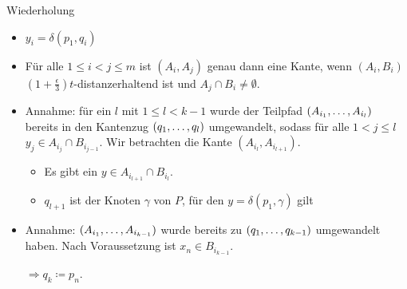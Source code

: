 \documentclass{beamer}
\begin{document}
	\begin{frame}[t]
		\begin{block}{Wiederholung}
			\begin{itemize}
				\item $y_i = \delta(p_1, q_i)$
				\item Für alle $1\leq i < j \leq m$ ist $(A_i, A_j)$ genau dann eine Kante, wenn $(A_i, B_i)$ $(1 + \frac{\epsilon}{3})t$-distanzerhaltend ist und $A_j \cap B_i \neq \emptyset$.
			\end{itemize}
		\end{block}
		
		
		\vspace{10px}
		\begin{itemize}
			\item<2-> Annahme: für ein $l$ mit $1 \leq l < k-1$ wurde der Teilpfad $(A_{i_1}, \mathellipsis, A_{i_l})$ bereits in den Kantenzug $(q_1, \mathellipsis, q_l)$ umgewandelt, sodass für alle $1 < j \leq l$ $y_j \in A_{i_j} \cap B_{i_{j-1}}$.  
			Wir betrachten die Kante $(A_{i_l}, A_{i_{l+1}})$.
			\begin{itemize}
				\item Es gibt ein $y \in A_{i_{l+1}} \cap B_{i_l}$.
				\item $q_{l+1}$ ist der Knoten $\gamma$ von $P$, für den $y = \delta(p_1, \gamma)$ gilt 
			\end{itemize}
			\item<3-> Annahme: $(A_{i_1}, \mathellipsis, A_{i_{k-1}})$ wurde bereits zu $(q_1, \mathellipsis, q_{k-1})$ umgewandelt haben. 
			Nach Voraussetzung ist $x_n \in B_{i_{k-1}}$. 
			
			$\Rightarrow q_k \coloneqq p_n$. 
		\end{itemize}
	\end{frame}
	
\end{document}
